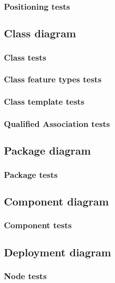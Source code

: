   \subsubsection{Positioning tests}

\subsection{Class diagram}
  \subsubsection{Class tests}
  \subsubsection{Class feature types tests}
  \subsubsection{Class template tests}

  \subsubsection{Qualified Association tests}
    
\subsection{Package diagram}
  \subsubsection{Package tests}

\subsection{Component diagram}
  \subsubsection{Component tests}

\subsection{Deployment diagram}
  \subsubsection{Node tests}
